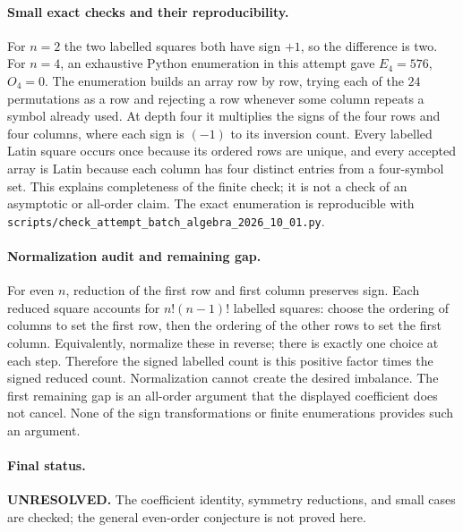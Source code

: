 \documentclass[11pt,a4paper]{article}
\begin{document}
\paragraph{Small exact checks and their reproducibility.}
For $n=2$ the two labelled squares both have sign $+1$, so the
difference is two. For $n=4$, an exhaustive Python enumeration in
this attempt gave $E_4=576$, $O_4=0$. The enumeration builds an array
row by row, trying each of the $24$ permutations as a row and rejecting
a row whenever some column repeats a symbol already used. At depth
four it multiplies the signs of the four rows and four columns,
where each sign is $(-1)$ to its inversion count. Every labelled
Latin square occurs once because its ordered rows are unique, and
every accepted array is Latin because each column has four distinct
entries from a four-symbol set. This explains completeness of the
finite check; it is not a check of an asymptotic or all-order claim.
The exact enumeration is reproducible with
\texttt{scripts/check\_attempt\_batch\_algebra\_2026\_10\_01.py}.

\paragraph{Normalization audit and remaining gap.}
For even $n$, reduction of the first row and first column preserves
sign. Each reduced square accounts for $n!(n-1)!$ labelled squares:
choose the ordering of columns to set the first row, then the ordering
of the other rows to set the first column. Equivalently, normalize
these in reverse; there is exactly one choice at each step. Therefore
the signed labelled count is this positive factor times the signed
reduced count. Normalization cannot create the desired imbalance.
The first remaining gap is an all-order argument that the displayed
coefficient does not cancel. None of the sign transformations or
finite enumerations provides such an argument.

\paragraph{Final status.}
\textbf{UNRESOLVED.} The coefficient identity, symmetry reductions,
and small cases are checked; the general even-order conjecture is
not proved here.
\end{document}
